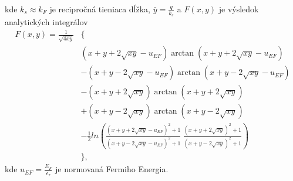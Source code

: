 kde $k_s\approx k_F$ je recipročná tieniaca dĺžka, $\bar{y}=\frac{q}{k_s}$  a $F(x,y)$ je výsledok analytických integrálov
\begin{align*}
F(x,y)=\frac{1}{\sqrt{4xy}}&\{ \\
&(x+y+2\sqrt{xy}-u_{EF})\arctan(x+y+2\sqrt{xy}-u_{EF}) \\
&-(x+y-2\sqrt{xy}-u_{EF})\arctan(x+y-2\sqrt{xy}-u_{EF}) \\
&-(x+y+2\sqrt{xy})\arctan(x+y+2\sqrt{xy}) \\
&+(x+y-2\sqrt{xy})\arctan(x+y-2\sqrt{xy}) \\
&-\frac{1}{2}ln(\frac{(x+y+2\sqrt{xy}-u_{EF})^2+1}{(x+y-2\sqrt{xy}-u_{EF})^2+1}\ \frac{(x+y+2\sqrt{xy})^2+1}{(x+y-2\sqrt{xy})^2+1})\\
&\}\text{,}
\end{align*}
kde $u_{EF}=\frac{E_F}{\epsilon_\tau}$ je normovaná Fermiho Energia.

